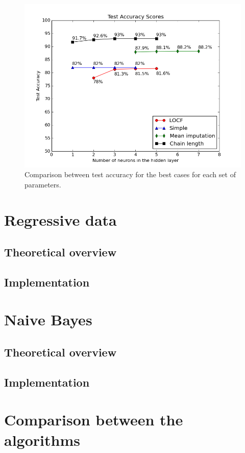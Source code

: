 \begin{figure}[h]
	\begin{center}
		\includegraphics[scale=0.6]{figures/ann_total.png}
	\end{center}
	
	\caption{Comparison between test accuracy for the best cases for each set of parameters.}
	\label{pic:ann_total}

\end{figure}
     

\section{Regressive data}

\subsection{Theoretical overview}

\subsection{Implementation}


\section{Naive Bayes}

\subsection{Theoretical overview}

\subsection{Implementation}

\section {Comparison between the algorithms}